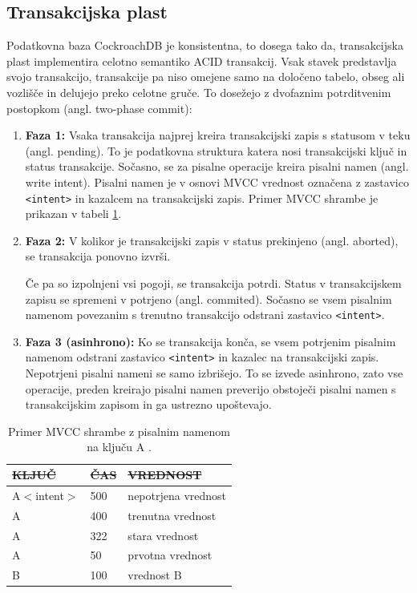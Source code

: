 \documentclass[a4paper, 12pt]{book}
\providecommand{\DIFaddtex}[1]{{\protect\color{blue}\uwave{#1}}} %
\providecommand{\DIFdeltex}[1]{{\protect\color{red}\sout{#1}}}                      %
\providecommand{\DIFaddFL}[1]{\DIFadd{#1}} %
\providecommand{\DIFdelFL}[1]{\DIFdel{#1}} %
\providecommand{\DIFaddbeginFL}{} %
\providecommand{\DIFaddendFL}{} %
\providecommand{\DIFdelbeginFL}{} %
\providecommand{\DIFdelendFL}{} %
\providecommand{\DIFadd}[1]{\texorpdfstring{\DIFaddtex{#1}}{#1}} %
\providecommand{\DIFdel}[1]{\texorpdfstring{\DIFdeltex{#1}}{}} %
\newcommand{\DIFscaledelfig}{0.5}
\newlength{\DIFdelgraphicswidth} %
\newlength{\DIFdelgraphicsheight} %
\newcommand{\DIFaddincludegraphics}[2][]{{\color{blue}\fbox{\DIFOincludegraphics[#1]{#2}}}} %
\newcommand{\DIFdelincludegraphics}[2][]{%
\sbox{\DIFdelgraphicsbox}{\DIFOincludegraphics[#1]{#2}}%
\settoboxwidth{\DIFdelgraphicswidth}{\DIFdelgraphicsbox} %
\settoboxtotalheight{\DIFdelgraphicsheight}{\DIFdelgraphicsbox} %
\scalebox{\DIFscaledelfig}{%
\parbox[b]{\DIFdelgraphicswidth}{\usebox{\DIFdelgraphicsbox}\\[-\baselineskip] \rule{\DIFdelgraphicswidth}{0em}}\llap{\resizebox{\DIFdelgraphicswidth}{\DIFdelgraphicsheight}{%
\setlength{\unitlength}{\DIFdelgraphicswidth}%
\begin{picture}(1,1)%
\thicklines\linethickness{2pt} %
{\color[rgb]{1,0,0}\put(0,0){\framebox(1,1){}}}%
{\color[rgb]{1,0,0}\put(0,0){\line( 1,1){1}}}%
{\color[rgb]{1,0,0}\put(0,1){\line(1,-1){1}}}%
\end{picture}%
}\hspace*{3pt}}} %
} %
\DeclareRobustCommand{\DIFaddbeginFL}{\DIFOaddbeginFL \let\includegraphics\DIFaddincludegraphics} %
\DeclareRobustCommand{\DIFaddendFL}{\DIFOaddendFL \let\includegraphics\DIFOincludegraphics} %
\DeclareRobustCommand{\DIFdelbeginFL}{\DIFOdelbeginFL \let\includegraphics\DIFdelincludegraphics} %
\DeclareRobustCommand{\DIFdelendFL}{\DIFOaddendFL \let\includegraphics\DIFOincludegraphics} %
\begin{document}
\subsection{Transakcijska plast}
Podatkovna baza CockroachDB je konsistentna, to dosega tako da, transakcijska plast implementira celotno semantiko ACID transakcij. Vsak stavek predstavlja svojo transakcijo, transakcije pa niso omejene samo na določeno tabelo, obseg ali vozlišče in delujejo preko celotne gruče. To dosežejo z dvofaznim potrditvenim postopkom (angl. two-phase commit):

\begin{enumerate}
    \item \textbf{Faza 1:} Vsaka transakcija najprej kreira transakcijski zapis s statusom v teku (angl. pending). To je podatkovna struktura katera nosi transakcijski ključ in status transakcije. Sočasno, se za pisalne operacije kreira pisalni namen (angl. write intent). Pisalni namen je v osnovi MVCC vrednost označena z zastavico \texttt{<intent>} in kazalcem na transakcijski zapis. Primer MVCC shrambe je prikazan v tabeli \ref{tbl_crdb_mvcc_store}.
    \item \textbf{Faza 2:} V kolikor je transakcijski zapis v status prekinjeno (angl. aborted), se transakcija ponovno izvrši.

    Če pa so izpolnjeni vsi pogoji, se transakcija potrdi. Status v transakcijskem zapisu se spremeni v potrjeno (angl. commited). Sočasno se vsem pisalnim namenom povezanim s trenutno transakcijo odstrani zastavico \texttt{<intent>}. 
    \item \textbf{Faza 3 (asinhrono):} Ko se transakcija konča, se vsem potrjenim pisalnim namenom odstrani zastavico \texttt{<intent>} in kazalec na transakcijski zapis. Nepotrjeni pisalni nameni se samo izbrišejo. To se izvede asinhrono, zato vse operacije, preden kreirajo pisalni namen preverijo obstoječi pisalni namen s transakcijskim zapisom in ga ustrezno upoštevajo.
\end{enumerate}

\begin{table}[H]
\begin{center}
\begin{tabular}{ |l|l|l| } 
\hline
\textbf{\DIFdelbeginFL \DIFdelFL{KLJUČ}\DIFdelendFL \DIFaddbeginFL \DIFaddFL{ključ}\DIFaddendFL } & \textbf{\DIFdelbeginFL \DIFdelFL{ČAS}\DIFdelendFL \DIFaddbeginFL \DIFaddFL{čas}\DIFaddendFL } & \textbf{\DIFdelbeginFL \DIFdelFL{VREDNOST}\DIFdelendFL \DIFaddbeginFL \DIFaddFL{vrednost}\DIFaddendFL } \\
\hline
A$<$intent$>$ & 500 & nepotrjena vrednost \\
A & 400 & trenutna vrednost \\ 
A & 322 & stara vrednost \\ 
A & 50 & prvotna vrednost \\
B & 100 & vrednost B \\
\hline
\end{tabular}
\end{center}
\caption{Primer MVCC shrambe z pisalnim namenom na ključu A \cite{CRDB-blog-transaction-isolation}.}
\label{tbl_crdb_mvcc_store}
\end{table}
\end{document}
